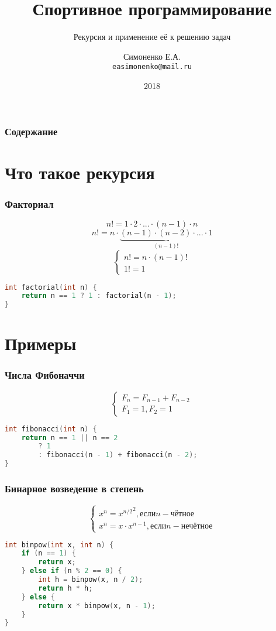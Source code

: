 \documentclass[11pt]{beamer}
\begin{document}
\author{Симоненко Е.А. \\ \texttt{easimonenko@mail.ru}}
\title{Спортивное программирование}
\subtitle{Рекурсия и применение её к решению задач}
\date{2018}

\begin{frame}
\titlepage
\end{frame}

\begin{frame}
\frametitle{Содержание}
\tableofcontents
\end{frame}

\section{Что такое рекурсия}

\begin{frame}[fragile]
\frametitle{Факториал}
\[n! = 1 \cdot 2 \cdot ... \cdot (n - 1) \cdot n\]
\[n! = n \cdot \underbrace{(n - 1) \cdot (n - 2) \cdot ... \cdot 1}_{(n - 1)!}\]
\[ \left\{
\begin{array}{l}
n! = n \cdot (n - 1)! \\
1! = 1
\end{array}
\right. \]
\begin{lstlisting}[frame=single,language=c]
int factorial(int n) {
    return n == 1 ? 1 : factorial(n - 1);
}
\end{lstlisting}
\end{frame}

\section{Примеры}

\begin{frame}[fragile]
\frametitle{Числа Фибоначчи}
\[\left\{
\begin{array}{l}
F_n = F_{n - 1} + F_{n - 2} \\
F_1 = 1, F_2 = 1
\end{array}
\right.\]
\begin{lstlisting}[frame=single,language=c]
int fibonacci(int n) {
    return n == 1 || n == 2
        ? 1
        : fibonacci(n - 1) + fibonacci(n - 2);
}
\end{lstlisting}
\end{frame}

\begin{frame}[fragile]
\frametitle{Бинарное возведение в степень}
\[\left\{
\begin{array}{l}
x^n = {x^{n / 2}}^2, \text{если} n - \text{чётное} \\
x^n = x \cdot x^{n - 1}, \text{если} n - \text{нечётное}
\end{array}
\right.\]
\begin{lstlisting}[frame=single,language=c]
int binpow(int x, int n) {
    if (n == 1) {
        return x;
    } else if (n % 2 == 0) {
        int h = binpow(x, n / 2);
        return h * h;
    } else {
        return x * binpow(x, n - 1);
    }
}
\end{lstlisting}
\end{frame}
\end{document}
